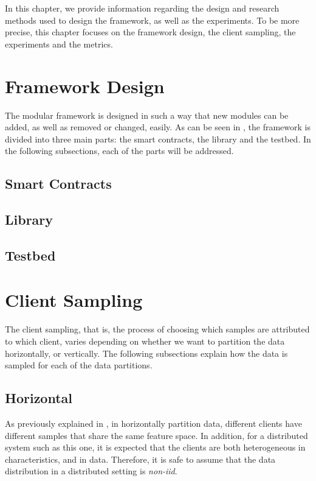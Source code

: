 In this chapter, we provide information regarding the design and research methods used to design the framework, as well as the experiments. To be more precise, this chapter focuses on the framework design, the client sampling, the experiments and the metrics.

\section{Framework Design}

The modular framework is designed in such a way that new modules can be added, as well as removed or changed, easily. As can be seen in , the framework is divided into three main parts: the smart contracts, the library and the testbed. In the following subsections, each of the parts will be addressed.


\subsection{Smart Contracts}

\subsection{Library}

\subsection{Testbed}

\section{Client Sampling}

The client sampling, that is, the process of choosing which samples are attributed to which client, varies depending on whether we want to partition the data horizontally, or vertically. The following subsections explain how the data is sampled for each of the data partitions.

\subsection{Horizontal}

As previously explained in , in horizontally partition data, different clients have different samples that share the same feature space. In addition, for a distributed system such as this one, it is expected that the clients are both heterogeneous in characteristics, and in data. Therefore, it is safe to assume that the data distribution in a distributed setting is \textit{non-iid}.

